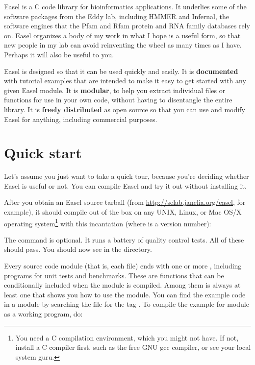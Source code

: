 



Easel is a C code library for bioinformatics applications. It
underlies some of the software packages from the Eddy lab, including
HMMER and Infernal, the software engines that the Pfam and Rfam
protein and RNA family databases rely on. Easel organizes a body of my
work in what I hope is a useful form, so that new people in my lab can
avoid reinventing the wheel as many times as I have. Perhaps it will
also be useful to you.

Easel is designed so that it can be used quickly and easily. It is
\textbf{documented} with tutorial examples that are intended to make
it easy to get started with any given Easel module. It is
\textbf{modular}, to help you extract individual files or functions
for use in your own code, without having to disentangle the entire
library. It is \textbf{freely distributed} as open source so that you
can use and modify Easel for anything, including commercial purposes.

\section{Quick start}

Let's assume you just want to take a quick tour, because you're
deciding whether Easel is useful or not. You can compile Easel and try
it out without installing it. 

After you obtain an Easel source tarball (from
\url{http://selab.janelia.org/easel}, for example), it should compile
out of the box on any UNIX, Linux, or Mac OS/X operating
system\footnote{You need a C compilation environment, which you might
not have. If not, install a C compiler first, such as the free GNU gcc
compiler, or see your local system guru.} with this incantation
(where  is a version number):

\begin{cchunk}
\end{cchunk}

The  command is optional. It runs a battery of
quality control tests. All of these should pass. You should now see
 in the directory.

Every source code module (that is, each  file) ends with one
or more , including programs for unit tests
and benchmarks. These are  functions that can be
conditionally included when the module is compiled. Among them is
always at least one  that shows you how to use
the module. You can find the example code in a module  by
searching the  file for the tag
. To compile the example for module
 as a working program, do:

